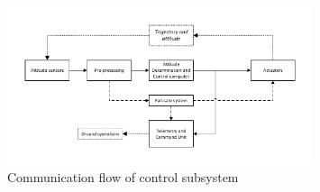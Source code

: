 \begin{figure}[H]
\centering
\includegraphics[width = 0.8\textwidth]{Figure/CommunicationChart.pdf}
\caption{Communication flow of control subsystem}
\label{fig:comflow}
\end{figure}

